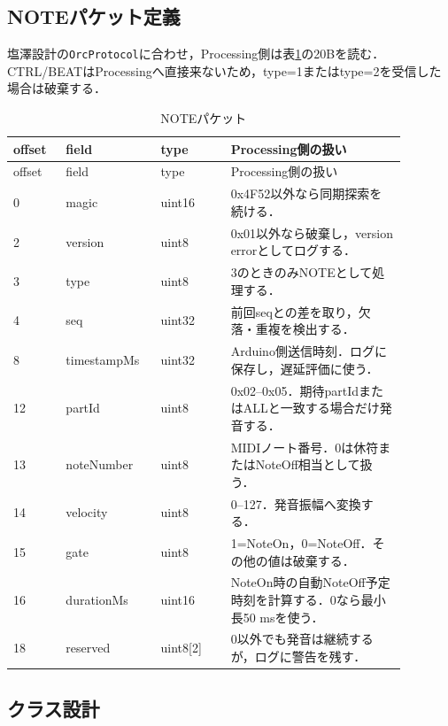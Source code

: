 \documentclass[a4paper,11pt]{jsarticle}
\begin{document}
\subsection{NOTEパケット定義}

塩澤設計の\texttt{OrcProtocol}に合わせ，Processing側は表\ref{tab:note-packet}の20Bを読む．
CTRL/BEATはProcessingへ直接来ないため，type=1またはtype=2を受信した場合は破棄する．

\begin{longtable}{p{0.12\linewidth}p{0.20\linewidth}p{0.16\linewidth}p{0.40\linewidth}}
\caption{NOTEパケット}\label{tab:note-packet}\\
\hline
offset & field & type & Processing側の扱い \\
\hline
\endfirsthead
\hline
offset & field & type & Processing側の扱い \\
\hline
\endhead
0 & magic & uint16 & 0x4F52以外なら同期探索を続ける． \\
\hline
2 & version & uint8 & 0x01以外なら破棄し，version errorとしてログする． \\
\hline
3 & type & uint8 & 3のときのみNOTEとして処理する． \\
\hline
4 & seq & uint32 & 前回seqとの差を取り，欠落・重複を検出する． \\
\hline
8 & timestampMs & uint32 & Arduino側送信時刻．ログに保存し，遅延評価に使う． \\
\hline
12 & partId & uint8 & 0x02--0x05．期待partIdまたはALLと一致する場合だけ発音する． \\
\hline
13 & noteNumber & uint8 & MIDIノート番号．0は休符またはNoteOff相当として扱う． \\
\hline
14 & velocity & uint8 & 0--127．発音振幅へ変換する． \\
\hline
15 & gate & uint8 & 1=NoteOn，0=NoteOff．その他の値は破棄する． \\
\hline
16 & durationMs & uint16 & NoteOn時の自動NoteOff予定時刻を計算する．0なら最小長50 msを使う． \\
\hline
18 & reserved & uint8[2] & 0以外でも発音は継続するが，ログに警告を残す． \\
\hline
\end{longtable}

\subsection{クラス設計}
\end{document}
